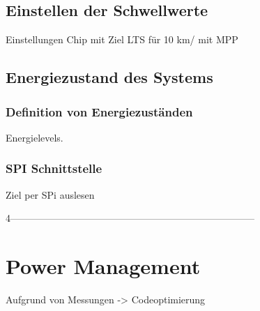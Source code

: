 \subsection{Einstellen der Schwellwerte}
\label{v_schwellwerte}

Einstellungen Chip mit Ziel LTS für 10 km/ mit  MPP



\subsection{Energiezustand des Systems}
\label{v_energiezustand}

\subsubsection{Definition von Energiezuständen}

Energielevels.


\subsubsection{SPI Schnittstelle}

Ziel per SPi auslesen






 4---------------------------------------------------------------------------
\section{Power Management}

Aufgrund von Messungen -> Codeoptimierung






%
%
%
%
%


